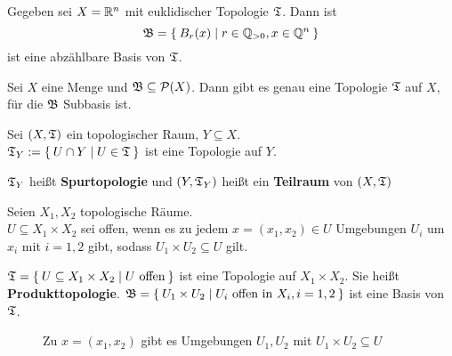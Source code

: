 \begin{beispiel}
    Gegeben sei $X = \mathbb{R}^n$ mit euklidischer Topologie $\mathfrak{T}$. Dann ist
    \[\mathfrak{B} = \Set{B_r(x) | r \in \ensuremath{\mathbb{Q}}_{> 0}, x \in \ensuremath{\mathbb{Q}}^n}\]
    ist eine abzählbare Basis von $\mathfrak{T}$.
\end{beispiel}

\begin{bemerkung}
    Sei $X$ eine Menge und $\mathfrak{B} \subseteq \mathcal{P}(X)$. Dann gibt es
    genau eine Topologie $\mathfrak{T}$ auf $X$, für die $\mathfrak{B}$ Subbasis ist.
\end{bemerkung}

\begin{definition}  
    Sei $(X, \mathfrak{T})$ ein topologischer Raum, $Y \subseteq X$.\\
    $\mathfrak{T}_Y := \Set{U \cap Y | U \in \mathfrak{T}}$ ist eine Topologie auf $Y$.

    $\mathfrak{T}_Y$ heißt \textbf{Spurtopologie} und $(Y, \mathfrak{T}_Y)$ heißt ein 
    \textbf{Teilraum} von $(X, \mathfrak{T})$
\end{definition}

\begin{definition} 
    Seien $X_1, X_2$ topologische Räume.\\
    $U \subseteq X_1 \times X_2$ sei offen, wenn es zu jedem $x = (x_1, x_2) \in U$
    Umgebungen $U_i$ um $x_i$  mit $i=1,2$ gibt, sodass $U_1 \times U_2 \subseteq U$
    gilt.

    $\mathfrak{T} = \Set{U \subseteq X_1 \times X_2 | U \text{ offen}}$
    ist eine Topologie auf $X_1 \times X_2$. Sie heißt \textbf{Produkttopologie}.
    $\mathfrak{B} = \Set{U_1 \times U_2 | U_i \text{ offen in } X_i, i=1,2}$
    ist eine Basis von $\mathfrak{T}$.
\end{definition}

\begin{figure}[htp]
    \centering
    
    \caption{Zu $x=(x_1, x_2)$ gibt es Umgebungen $U_1, U_2$ mit $U_1 \times U_2 \subseteq U$}
\end{figure}

